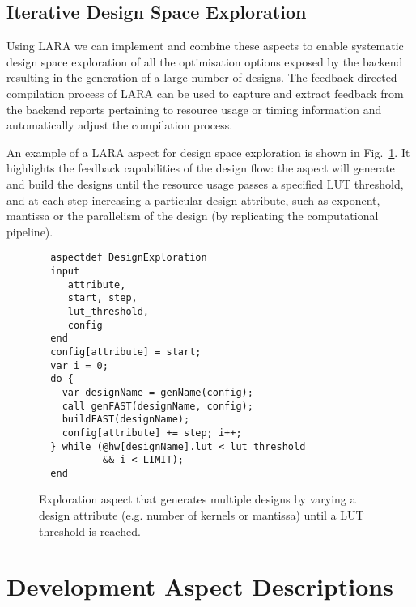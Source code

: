 \subsection{Iterative Design Space Exploration}
\label{sect:asp_it}
Using LARA we can implement and combine these aspects to enable
systematic design space exploration of all the optimisation options
exposed by the \FAST{} backend resulting in the generation of a large
number of designs. The feedback-directed compilation process of LARA
can be used to capture and extract feedback from the backend reports
pertaining to resource usage or timing information and automatically
adjust the compilation process.

An example of a LARA aspect for design space exploration is
shown in Fig.~\ref{fig:aspect-exploration}. It highlights the feedback capabilities of the design
flow: the aspect will generate and build the \FAST{} designs until the
resource usage passes a specified LUT threshold, and at each step
increasing a particular design attribute, such as exponent, mantissa or the parallelism of the design (by replicating the computational pipeline).

\lstset{style=lara}
\begin{figure}[!h]
\begin{lstlisting}
  aspectdef DesignExploration
  input
     attribute,
     start, step,
     lut_threshold,
     config
  end
  config[attribute] = start;
  var i = 0;
  do {
    var designName = genName(config);
    call genFAST(designName, config);
    buildFAST(designName);
    config[attribute] += step; i++;
  } while (@hw[designName].lut < lut_threshold
           && i < LIMIT);
  end
\end{lstlisting}
\caption{Exploration aspect that generates multiple \FAST{} designs by varying a design attribute (e.g. number of kernels or mantissa) until a LUT threshold is reached.}
\label{fig:aspect-exploration}
\end{figure}


\section{Development Aspect Descriptions}

